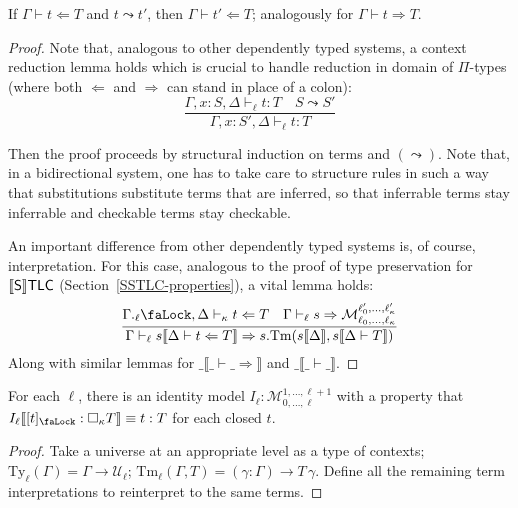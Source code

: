 \begin{theorem}
    If $\Gamma\vdash t\Leftarrow T$ and $t\leadsto t'$,
    then $\Gamma\vdash t'\Leftarrow T$; analogously for
    $\Gamma\vdash t\Rightarrow T$.
\end{theorem}
\begin{proof}
    Note that, analogous to other dependently typed
    systems, a context reduction lemma holds which is
    crucial to handle reduction in domain of
    $\Pi$-types (where both $\Leftarrow$ and
    $\Rightarrow$ can stand in place of a colon):
    \[
        \dfrac{
            \Gamma,x:S,\Delta\vdash_\ell t:T
            \quad S\leadsto S'
        }{\Gamma,x:S',\Delta\vdash_\ell t:T}
    \]

    Then the proof proceeds by structural induction on
    terms and $(\leadsto)$. Note that, in a
    bidirectional system, one has to take care to
    structure rules in such a way that substitutions
    substitute terms that are inferred, so that
    inferrable terms stay inferrable and checkable
    terms stay checkable.

    An important difference from other dependently
    typed systems is, of course, interpretation. For
    this case, analogous to the proof of type
    preservation for $\llbracket\mathsf{S}\rrbracket\mathsf{TLC}$
    (Section~\ref{SSTLC-properties}), a vital lemma
    holds:
    \[  \dfrac{
            \Gamma.{}_\ell\text{\faLock},\Delta
                \vdash_\kappa t\Leftarrow T
            \quad\Gamma\vdash_\ell s\Rightarrow
                \mathcal{M}_{\ell_0,\ldots,\ell_\kappa
                }^{\ell'_0,\ldots,\ell'_\kappa}
        }{\Gamma\vdash_\ell s\llbracket\Delta\vdash t
        \Leftarrow T\rrbracket\Rightarrow
            s.\mathrm{Tm}(s\llbracket\Delta\rrbracket,
                s\llbracket\Delta\vdash T\rrbracket)}
    \]
    Along with similar lemmas for
    $\_\llbracket\_\vdash\_\Rightarrow\rrbracket$ and
    $\_\llbracket\_\vdash\_\rrbracket$.
\end{proof}

\begin{theorem}
    For each $\ell$, there is an identity model
    $I_\ell:\mathcal{M}_{0,\ldots,\ell}^{1,\ldots,
    \ell+1}$ with a property that $I_\ell\llbracket
    [t]_\text{\faLock}:\Box_\kappa T\rrbracket\equiv
    t:T$ for each closed $t$.
\end{theorem}
\begin{proof}
    Take a universe at an appropriate level as a type of
    contexts; $\mathrm{Ty}_\ell(\Gamma)=
    \Gamma\to\mathcal{U}_\ell$;
    $\mathrm{Tm}_\ell(\Gamma, T)=(\gamma:\Gamma)\to
    T\,\gamma$. Define all the remaining term
    interpretations to reinterpret to the same terms.
\end{proof}

